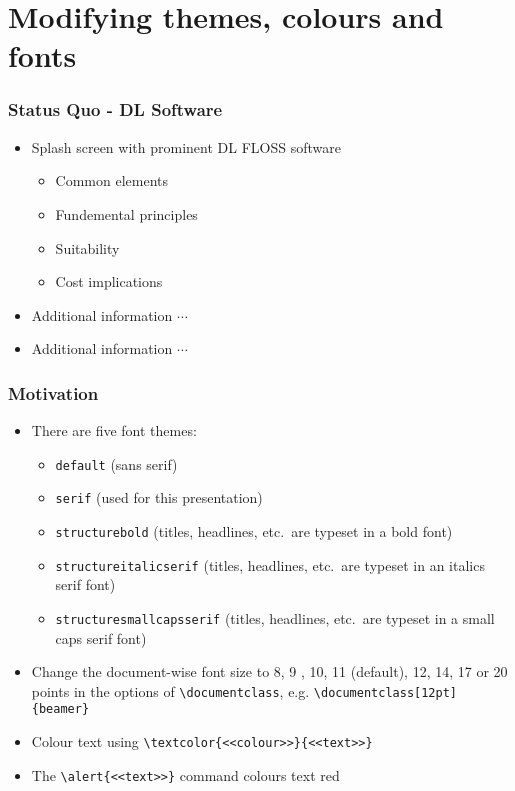 \documentclass[xcolor=dvitex,t,11pt]{beamer}
\begin{document}
\section{Modifying themes, colours and fonts}


\begin{frame}[fragile]
\frametitle{Status Quo - DL Software}
\begin{itemize}
\item Splash screen with prominent DL FLOSS software
\begin{itemize}
	\item Common elements
	\item Fundemental principles
	\item Suitability
	\item Cost implications
\end{itemize}
\item Additional information $\cdots$
\item Additional information $\cdots$
\end{itemize}
\end{frame}

\begin{frame}[fragile]
\frametitle{Motivation}
\begin{itemize}
\item There are five font themes: 
\begin{itemize}
	\item \verb!default! (sans serif)
	\item \verb!serif! (used for this presentation) 
	\item \verb!structurebold! (titles, headlines, etc.\ are typeset in a bold font)
	\item \verb!structureitalicserif! (titles, headlines, etc.\ are typeset in an italics serif font)
	\item \verb!structuresmallcapsserif! (titles, headlines, etc.\ are typeset in a small caps serif font)
\end{itemize}
\item Change the document-wise font size to 8, 9 , 10, 11 (default), 12, 14, 17 or 20 points in the options of \verb!\documentclass!, e.g. \verb!\documentclass[12pt]{beamer}!
\item Colour text using \verb!\textcolor{<<colour>>}{<<text>>}!
\item The \verb!\alert{<<text>>}! command colours text red
\end{itemize}
\end{frame}
\end{document}
